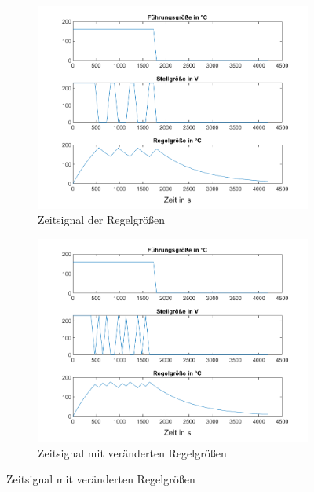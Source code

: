 \documentclass[
    paper=a4,
    fontsize=10pt,
    DIV=13,
    oneside,
]{scrartcl}
\begin{document}
    
    \begin{figure}
        \centering
        \begin{subfigure}{0.49\columnwidth}
            \includegraphics[width=1.0\columnwidth]{../versuch1/tempregler_plot.png}
            \caption{Zeitsignal der Regelgrößen}
            \label{fig:temp_regler}    
        \end{subfigure}%
        \hfill%
        \begin{subfigure}{0.49\columnwidth}
            \includegraphics[width=1.0\columnwidth]{../versuch1/tempregler_plot_new.png}
            \caption{Zeitsignal mit veränderten Regelgrößen}
            \label{fig:tempregler_new}
        \end{subfigure}
    \end{figure}
\end{document}
